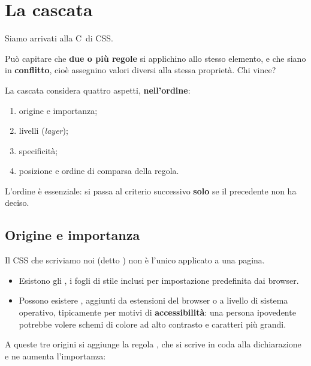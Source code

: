 \section{La cascata}

Siamo arrivati alla \guillemotleft C\guillemotright\ di CSS.

Può capitare che \textbf{due o più regole} si applichino allo stesso elemento, e
che siano in \textbf{conflitto}, cioè assegnino valori diversi alla stessa
proprietà. Chi vince?


La cascata considera quattro aspetti, \textbf{nell'ordine}:

\begin{enumerate}
  \item origine e importanza;
  \item livelli (\textit{layer});
  \item specificità;
  \item posizione e ordine di comparsa della regola.
\end{enumerate}

L'ordine è essenziale: si passa al criterio successivo \textbf{solo} se il
precedente non ha deciso.

\subsection{Origine e importanza}

Il CSS che scriviamo noi (detto ) non è l'unico applicato a
una pagina.

\begin{itemize}
  \item Esistono gli , i fogli di stile inclusi per
        impostazione predefinita dai browser.
  \item Possono esistere , aggiunti da estensioni del
        browser o a livello di sistema operativo, tipicamente per motivi di
        \textbf{accessibilità}: una persona ipovedente potrebbe volere schemi di
        colore ad alto contrasto e caratteri più grandi.
\end{itemize}

A queste tre origini si aggiunge la regola , che si scrive in
coda alla dichiarazione e ne aumenta l'importanza:


